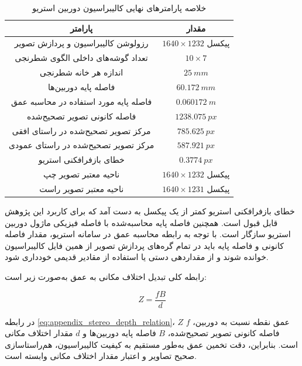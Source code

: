 \begin{table}[htbp]
	\centering
	\caption{خلاصه پارامترهای نهایی کالیبراسیون دوربین استریو}
	\label{tab:stereo_calibration_final_params}
	\renewcommand{\arraystretch}{1.45}
	\begin{tabular}{|c|c|}
		\hline
		\textbf{پارامتر} & \textbf{مقدار} \\
		\hline
		رزولوشن کالیبراسیون و پردازش تصویر & $1640 \times 1232$ پیکسل \\
		\hline
		تعداد گوشه‌های داخلی الگوی شطرنجی & $10 \times 7$ \\
		\hline
		اندازه هر خانه شطرنجی & $25~mm$ \\
		\hline
		فاصله پایه دوربین‌ها & $60.172~mm$ \\
		\hline
		فاصله پایه مورد استفاده در محاسبه عمق & $0.060172~m$ \\
		\hline
		فاصله کانونی تصویر تصحیح‌شده & $1238.075~px$ \\
		\hline
		مرکز تصویر تصحیح‌شده در راستای افقی & $785.625~px$ \\
		\hline
		مرکز تصویر تصحیح‌شده در راستای عمودی & $587.921~px$ \\
		\hline
		خطای بازفرافکنی استریو \lr{RMS} & $0.3774~px$ \\
		\hline
		ناحیه معتبر تصویر چپ & $1640 \times 1232$ پیکسل \\
		\hline
		ناحیه معتبر تصویر راست & $1640 \times 1231$ پیکسل \\
		\hline
	\end{tabular}
\end{table}

خطای بازفرافکنی استریو کمتر از یک پیکسل به دست آمد که برای کاربرد این پژوهش قابل قبول است. همچنین فاصله پایه محاسبه‌شده با فاصله فیزیکی ماژول دوربین استریو سازگار است. با توجه به رابطه محاسبه عمق در سامانه استریو، مقدار فاصله کانونی و فاصله پایه باید در تمام گره‌های پردازش تصویر از همین فایل کالیبراسیون خوانده شوند و از مقداردهی دستی یا استفاده از مقادیر قدیمی خودداری شود.

رابطه کلی تبدیل اختلاف مکانی به عمق به‌صورت زیر است:

\begin{equation}
	Z = \frac{fB}{d}
	\label{eq:appendix_stereo_depth_relation}
\end{equation}

در رابطه \ref{eq:appendix_stereo_depth_relation}، $Z$ عمق نقطه نسبت به دوربین، $f$ فاصله کانونی تصویر تصحیح‌شده، $B$ فاصله پایه دوربین‌ها و $d$ مقدار اختلاف مکانی است. بنابراین، دقت تخمین عمق به‌طور مستقیم به کیفیت کالیبراسیون، هم‌راستاسازی صحیح تصاویر و اعتبار مقدار اختلاف مکانی وابسته است.


